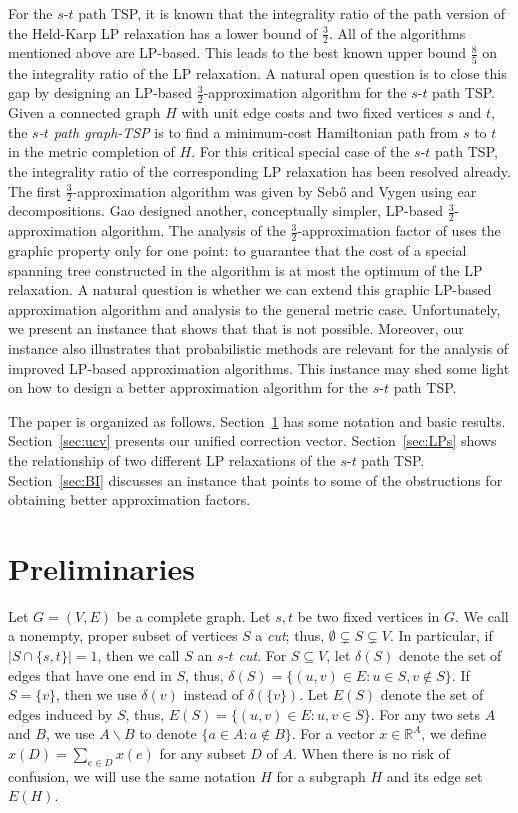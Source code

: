 \documentclass[11pt]{article}
\begin{document}
For the $s$-$t$ path TSP, it is known that the integrality ratio
of the path version of the Held-Karp LP relaxation has a lower bound
of $\frac{3}{2}$. All of the algorithms mentioned above are LP-based.
This leads to the best known upper bound $\frac{8}{5}$ on the integrality
ratio of the LP relaxation. A natural open question is to close this
gap by designing an LP-based $\frac{3}{2}$-approximation algorithm
for the $s$-$t$ path TSP. Given a connected graph $H$ with unit
edge costs and two fixed vertices $s$ and $t$, the \emph{$s$-$t$
path graph-TSP} is to find a minimum-cost Hamiltonian path from $s$
to $t$ in the metric completion of $H$. For this critical special
case of the $s$-$t$ path TSP, the integrality ratio of the corresponding
LP relaxation has been resolved already. The first
$\frac{3}{2}$-approximation algorithm was given by Seb\H{o} and Vygen
\cite{SV12} using ear decompositions.  Gao \cite{Gao13} designed
another, conceptually simpler, LP-based
$\frac{3}{2}$-approximation algorithm.
The analysis of the $\frac{3}{2}$-approximation factor of \cite{Gao13}
uses the graphic property only for one point: to guarantee that the
cost of a special spanning tree constructed in the algorithm is at
most the optimum of the LP relaxation. A natural question is whether we can
extend this graphic LP-based approximation algorithm and analysis
to the general metric case. Unfortunately, we present an instance
that shows that that is not possible.  Moreover, our instance also illustrates that probabilistic methods
are relevant for the analysis of improved LP-based approximation
algorithms.  This instance may shed some
light on how to design a better approximation algorithm for the
$s$-$t$ path TSP.

The paper is organized as follows. Section~\ref{sec:pre} has some
notation and basic results. Section~\ref{sec:ucv} presents our
unified correction vector. Section~\ref{sec:LPs} shows the relationship
of two different LP relaxations of the $s$-$t$ path TSP.
Section~\ref{sec:BI} discusses an instance that points to some
of the obstructions for obtaining better approximation factors.



\section{Preliminaries}\label{sec:pre}

Let $G=(V, E)$ be a complete graph.
Let $s,t$ be two fixed vertices in $G$.
We call a nonempty, proper subset of vertices $S$ a \emph{cut};
thus, $\emptyset\subsetneq S\subsetneq V$.
In particular, if $|S \cap \{s, t\}|=1$,
then we call $S$ an \emph{$s$-$t$ cut}.
For $S\subseteq{V}$, let $\delta(S)$ denote the set of edges
that have one end in $S$, thus,
$\delta(S)=\{(u,v) \in E: u\in S,  v\notin S\}$.
If $S=\{v\}$, then we use $\delta(v)$ instead of $\delta(\{v\})$.
Let $E(S)$ denote the set of edges induced by $S$, thus,
$E(S) = \{(u,v)\in E: u, v \in S\}$.
For any two sets $A$ and $B$,
we use $A\backslash B$ to denote $\{a\in A: a\notin B\}$. For a vector $x\in \mathbb{R}^{A}$, we define $x(D)=\sum_{e\in D}x(e)$
for any subset $D$ of $A$. When there is no risk of confusion, we will use the same notation $H$ for a subgraph $H$ and its edge set $E(H)$.
\end{document}
